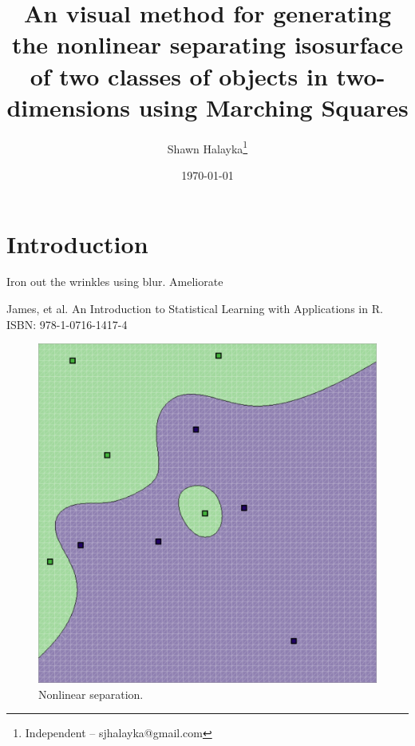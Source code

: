 \documentclass[12pt]{article}
\title{An visual method for generating the nonlinear separating isosurface of two classes of objects in two-dimensions using Marching Squares}
\author{
Shawn Halayka\footnote{Independent -- sjhalayka@gmail.com}
}
\date{\today\;\currenttime}
\begin{document}
\maketitle

\begin{abstract}

\end{abstract}




\section{Introduction}

Iron out the wrinkles using blur.
Ameliorate


\pagebreak





\begin{thebibliography}{9}

 James, et al. An Introduction to Statistical Learning with Applications in R. ISBN: 978-1-0716-1417-4

\end{thebibliography}





\pagebreak






\begin{figure} 
\centering
  \includegraphics[width = 3 in]{64_res.png}
  \caption{Nonlinear separation.
}
\end{figure}
\end{document}
